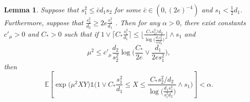 \documentclass{article}
\newcommand{\EE}{\mathbb{E}}
\newcommand{\one}{\mathds{1}}
\newcommand{\Ct}{C_{*}}
\newcommand{\ju}[1]{{\color{purple}Julien: #1}}
\newtheorem{lemma}{Lemma}
\theoremstyle{remark}
\begin{document}
\begin{lemma}\label{lem_lb_s2d2big_maxlin}
    Suppose that $s_1^2 \leq \bar{c}d_1s_2$ for some $\bar{c} \in (0, (2e)^{-4})$ and $s_1 < \frac12 d_1$. 
    Furthermore, suppose that $\frac{s^2_2}{d_2} \geq 2e\frac{s_1^2}{d_1}$ . Then for any $\alpha > 0$, there exist constants $c'_{\mu} > 0$ and $\Ct > 0$ such that if $1 \vee \lceil \Ct \frac{s_1^2}{d_1}\rceil \leq \big\lfloor \frac{\Ct s_2^2/d_2}{\log\big(\frac{d_1s_2^2}{s_1^2d_2}\big)}\big\rfloor\wedge s_1$ and
    \[\mu^2 \leq c'_\mu \frac{d_2}{s_2^2}\log\big(\frac{\Ct}{2e}\vee \frac{d_1}{2es^2_1}\big),\]
    then
    \[\EE\left[\exp\big(\mu^2XY\big)\one\bigg(1 \vee \Ct \frac{s_1^2}{d_1} \leq X \leq \frac{\Ct s_2^2/d_2}{\log\big(\frac{d_1s_2^2}{s_1^2d_2}\big)}\wedge s_1\bigg)\right] < \alpha.\]
\end{lemma}
\end{document}
